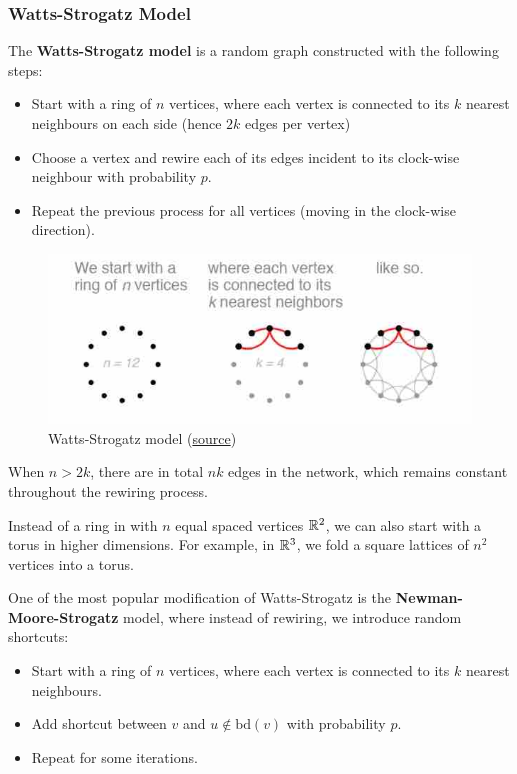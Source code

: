 \documentclass{article}
\begin{document}
\subsubsection{Watts-Strogatz Model}
The \textbf{Watts-Strogatz model} is a random graph constructed with the following steps:
\begin{itemize}
    \item Start with a ring of $n$ vertices, where each vertex is connected to its $k$ nearest neighbours on each side (hence $2k$ edges per vertex)
    \item Choose a vertex and rewire each of its edges incident to its clock-wise neighbour with probability $p$.
    \item Repeat the previous process for all vertices (moving in the clock-wise direction).
\end{itemize}

\begin{figure}[H]
    \centering
    \includegraphics[width=0.5\linewidth]{figures/strogatz.png}
    \caption{Watts-Strogatz model (\href{https://www.kth.se}{source})} %
    \label{fig:watts-strogatz}
\end{figure}

When $n>2k$, there are in total $nk$ edges in the network, which remains constant throughout the rewiring process.

\begin{remark}
    Instead of a ring in with $n$ equal spaced vertices $\mathbb{R}^2$, we can also start with a torus in higher dimensions. For example, in $\mathbb{R}^3$, we fold a square lattices of $n^2$ vertices into a torus.
\end{remark}  

One of the most popular modification of Watts-Strogatz is the \textbf{Newman-Moore-Strogatz} model, where instead of rewiring, we introduce random shortcuts:
\begin{itemize}
    \item Start with a ring of $n$ vertices, where each vertex is connected to its $k$ nearest neighbours.
    \item Add shortcut between $v$ and $u\notin \text{bd}(v)$ with probability $p$.
    \item Repeat for some iterations.
\end{itemize}
\end{document}

